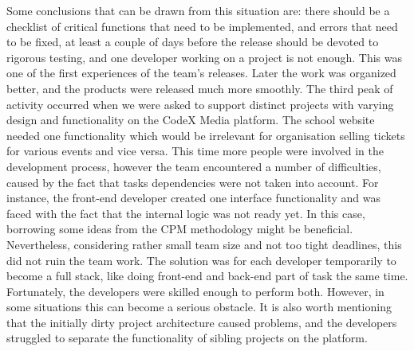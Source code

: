 \documentclass[conference]{IEEEtran}
\begin{document}
    Some conclusions that can be drawn from this situation are: there should be a checklist of critical functions that need to be implemented, and errors that need to be fixed, at least a couple of days before the release should be devoted to rigorous testing, and one developer working on a project is not enough.
    This was one of the first experiences of the team's releases.
    Later the work was organized better, and the products were released much more smoothly.\newline
    The third peak of activity occurred when we were asked to support distinct projects with varying design and functionality on the CodeX Media platform.
    The school website needed one functionality which would be irrelevant for organisation selling tickets for various events and vice versa.\newline
    This time more people were involved in the development process, however the team encountered a number of difficulties, caused by the fact that tasks dependencies were not taken into account.
    For instance, the front-end developer created one interface functionality and was faced with the fact that the internal logic was not ready yet.
    In this case, borrowing some ideas from the CPM methodology might be beneficial.
    Nevertheless, considering rather small team size and not too tight deadlines, this did not ruin the team work.
    The solution was for each developer temporarily to become a full stack, like doing front-end and back-end part of task the same time.
    Fortunately, the developers were skilled enough to perform both.
    However, in some situations this can become a serious obstacle.
    It is also worth mentioning that the initially dirty project architecture caused problems, and the developers struggled to separate the functionality of sibling projects on the platform.
\end{document}
